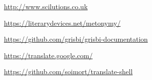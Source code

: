 

\urldef{\urlBob}%
\url{http://www.scilutions.co.uk}

\urldef{\urlMetonym}%
\url{https://literarydevices.net/metonymy/}

\urldef{\urlGitDoc}%
\url{https://github.com/grisbi/grisbi-documentation}

\urldef{\urlGtrans}%
\url{https://translate.google.com/}

\urldef{\urlGtransShell}%
\url{https://github.com/soimort/translate-shell}





